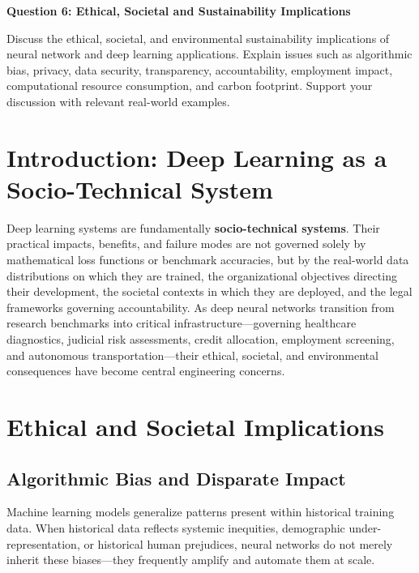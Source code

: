 \documentclass[12pt,a4paper]{article}
\begin{document}
{\noindent\LARGE\textbf{Question 6: Ethical, Societal and Sustainability Implications}}\par
\vspace{0.8em}
\noindent Discuss the ethical, societal, and environmental sustainability implications of neural network and deep learning applications. Explain issues such as algorithmic bias, privacy, data security, transparency, accountability, employment impact, computational resource consumption, and carbon footprint. Support your discussion with relevant real-world examples.
\par\vspace{1.2em}

\section{Introduction: Deep Learning as a Socio-Technical System}
Deep learning systems are fundamentally \textbf{socio-technical systems}. Their practical impacts, benefits, and failure modes are not governed solely by mathematical loss functions or benchmark accuracies, but by the real-world data distributions on which they are trained, the organizational objectives directing their development, the societal contexts in which they are deployed, and the legal frameworks governing accountability. As deep neural networks transition from research benchmarks into critical infrastructure—governing healthcare diagnostics, judicial risk assessments, credit allocation, employment screening, and autonomous transportation—their ethical, societal, and environmental consequences have become central engineering concerns.

\section{Ethical and Societal Implications}

\subsection{Algorithmic Bias and Disparate Impact}
Machine learning models generalize patterns present within historical training data. When historical data reflects systemic inequities, demographic under-representation, or historical human prejudices, neural networks do not merely inherit these biases—they frequently amplify and automate them at scale.
\end{document}
